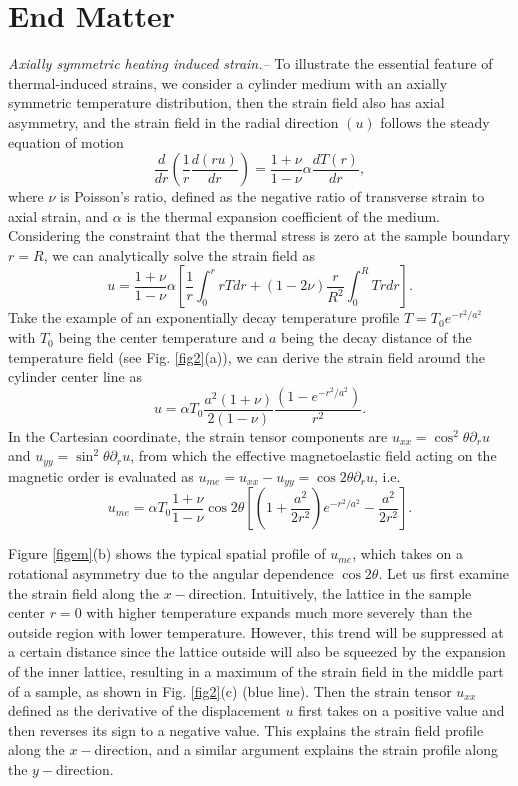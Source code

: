 \documentclass[aps,prl,reprint,floatfix,longbibliography,twocolumn]{revtex4-2}
\begin{document}
\section{End Matter}
\textit{Axially symmetric heating induced strain.--}
To illustrate the essential feature of thermal-induced strains, we consider a cylinder medium with an axially symmetric temperature distribution, then the strain field also has axial asymmetry, and the strain field in the radial direction $(u)$ follows the steady equation of motion \cite{Landaubook,Hetnarski}
\begin{equation}
\frac{d}{dr}\left ( \frac{1}{r} \frac{d(ru)}{dr}\right) = \frac{1+\nu}{1-\nu} \alpha \frac{dT(r)}{dr},
\end{equation}
where $\nu$ is Poisson's ratio, defined as the negative ratio of transverse strain to axial strain, and $\alpha$ is the thermal expansion coefficient of the medium. Considering the constraint that the thermal stress is zero at the sample boundary $r=R$, we can analytically solve the strain field as
\begin{equation}
u=\frac{1+\nu}{1-\nu}\alpha \left [ \frac{1}{r} \int_0^r rTdr + (1-2\nu) \frac{r}{R^2}\int_0^R Trdr\right].
\end{equation}
Take the example of an exponentially decay temperature profile $T=T_0 e^{-r^2/a^2}$ with $T_0$ being the center temperature and $a$ being the decay distance of the temperature field (see Fig. \ref{fig2}(a)), we can derive the strain field around the cylinder center line as
\begin{equation}
u=\alpha T_0 \frac{a^2(1+\nu)}{2(1-\nu)} \frac{(1-e^{-r^2/a^2})}{r^2}.
\end{equation}
In the Cartesian coordinate, the strain tensor components are $u_{xx}=\cos^2\theta \partial_ru$ and $u_{yy}=\sin^2\theta \partial_ru$, from which the effective magnetoelastic field acting on the magnetic order is evaluated as $u_{me}= u_{xx}-u_{yy}=\cos 2\theta \partial_ru$, i.e.
\begin{equation}
u_{me}=\alpha T_0 \frac{1+\nu}{1-\nu} \cos 2\theta \left [ \left(1+\frac{a^2}{2r^2}\right)e^{-r^2/a^2}-\frac{a^2}{2r^2} \right ].
\end{equation}

Figure \ref{figem}(b) shows the typical spatial profile of $u_{me}$, which takes on a rotational asymmetry due to the angular dependence $\cos 2\theta$. Let us first examine the strain field along the $x-$direction. Intuitively, the lattice in the sample center $r=0$ with higher temperature expands much more severely than the outside region with lower temperature. However, this trend will be suppressed at a certain distance since the lattice outside will also be squeezed by the expansion of the inner lattice, resulting in a maximum of the strain field in the middle part of a sample, as shown in Fig. \ref{fig2}(c) (blue line). Then the strain tensor $u_{xx}$ defined as the derivative of the displacement $u$ first takes on a positive value and then reverses its sign to a negative value. This explains the strain field profile along the $x-$direction, and a similar argument explains the strain profile along the $y-$direction.
\end{document}
